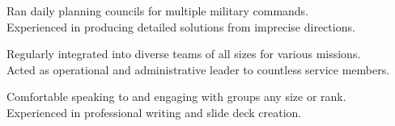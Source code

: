 Ran daily planning councils for multiple military commands. \\
Experienced in producing detailed solutions from imprecise directions.\\
\sectionsep

Regularly integrated into diverse teams of all sizes for various missions. \\
Acted as operational and administrative leader to countless service members. \\
\sectionsep

Comfortable speaking to and engaging with groups any size or rank. \\
Experienced in professional writing and slide deck creation. \\
\sectionsep
